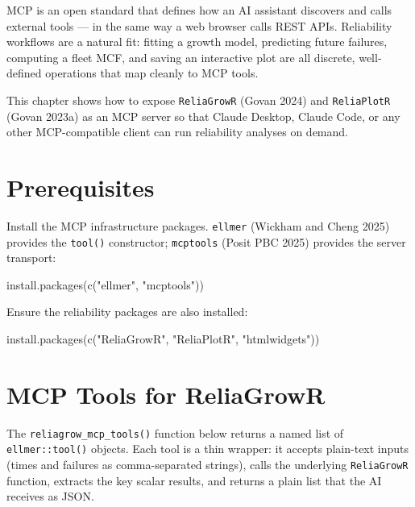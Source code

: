 \documentclass[
  letterpaper,
  DIV=11,
  numbers=noendperiod]{scrreprt}
\newenvironment{Shaded}{\begin{snugshade}}{\end{snugshade}}
\newcommand{\FunctionTok}[1]{\textcolor[rgb]{0.28,0.35,0.67}{#1}}
\newcommand{\NormalTok}[1]{\textcolor[rgb]{0.00,0.23,0.31}{#1}}
\newcommand{\StringTok}[1]{\textcolor[rgb]{0.13,0.47,0.30}{#1}}
\begin{document}
MCP is an open standard that defines how an AI assistant discovers and
calls external tools --- in the same way a web browser calls REST APIs.
Reliability workflows are a natural fit: fitting a growth model,
predicting future failures, computing a fleet MCF, and saving an
interactive plot are all discrete, well-defined operations that map
cleanly to MCP tools.

This chapter shows how to expose \texttt{ReliaGrowR} (Govan 2024) and
\texttt{ReliaPlotR} (Govan 2023a) as an MCP server so that Claude
Desktop, Claude Code, or any other MCP-compatible client can run
reliability analyses on demand.

\section{Prerequisites}\label{prerequisites}

Install the MCP infrastructure packages. \texttt{ellmer} (Wickham and
Cheng 2025) provides the \texttt{tool()} constructor; \texttt{mcptools}
(Posit PBC 2025) provides the server transport:

\begin{Shaded}
\begin{Highlighting}[]
\FunctionTok{install.packages}\NormalTok{(}\FunctionTok{c}\NormalTok{(}\StringTok{"ellmer"}\NormalTok{, }\StringTok{"mcptools"}\NormalTok{))}
\end{Highlighting}
\end{Shaded}

Ensure the reliability packages are also installed:

\begin{Shaded}
\begin{Highlighting}[]
\FunctionTok{install.packages}\NormalTok{(}\FunctionTok{c}\NormalTok{(}\StringTok{"ReliaGrowR"}\NormalTok{, }\StringTok{"ReliaPlotR"}\NormalTok{, }\StringTok{"htmlwidgets"}\NormalTok{))}
\end{Highlighting}
\end{Shaded}

\section{MCP Tools for ReliaGrowR}\label{mcp-tools-for-reliagrowr}

The \texttt{reliagrow\_mcp\_tools()} function below returns a named list
of \texttt{ellmer::tool()} objects. Each tool is a thin wrapper: it
accepts plain-text inputs (times and failures as comma-separated
strings), calls the underlying \texttt{ReliaGrowR} function, extracts
the key scalar results, and returns a plain list that the AI receives as
JSON.
\end{document}
